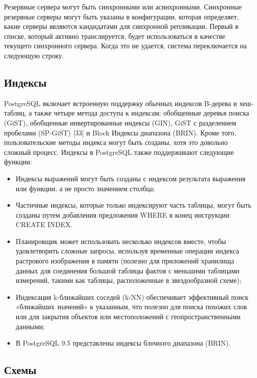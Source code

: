 Резервные сервера могут быть синхронными или асинхронными. Синхронные резервные серверы могут быть указаны в конфигурации, которая определяет, какие серверы являются кандидатами для синхронной репликации. Первый в списке, который активно транслируется, будет использоваться в качестве текущего синхронного сервера. Когда это не удается, система переключается на следующую строку.


\subsection{Индексы}\label{sec:subs2}

PostgreSQL включает встроенную поддержку обычных индексов B-дерева и хеш-таблиц, а также четыре метода доступа к индексам: обобщенные деревья поиска (GiST), обобщенные инвертированные индексы (GIN), GiST с разделением пробелами (SP-GiST) [33] и Block Индексы диапазона (BRIN). Кроме того, пользовательские методы индекса могут быть созданы, хотя это довольно сложный процесс. Индексы в PostgreSQL также поддерживают следующие функции:

\begin{itemize}
  \item Индексы выражений могут быть созданы с индексом результата выражения или функции, а не просто значением столбца;
  \item Частичные индексы, которые только индексируют часть таблицы, могут быть созданы путем добавления предложения WHERE в конец инструкции CREATE INDEX. 
  \item Планировщик может использовать несколько индексов вместе, чтобы удовлетворить сложные запросы, используя временные операции индекса растрового изображения в памяти (полезно для приложений хранилища данных для соединения большой таблицы фактов с меньшими таблицами измерений, такими как таблицы, расположенные в звездообразной схеме);
  \item Индексация k-ближайших соседей (k-NN) обеспечивает эффективный поиск «ближайших значений» к указанным, что полезно для поиска похожих слов или для закрытия объектов или местоположений с геопространственными данными;
  \item В PostgreSQL 9.5 представлены индексы блочного диапазона (BRIN).
\end{itemize}


\subsection{Схемы}\label{sec:subs3}


